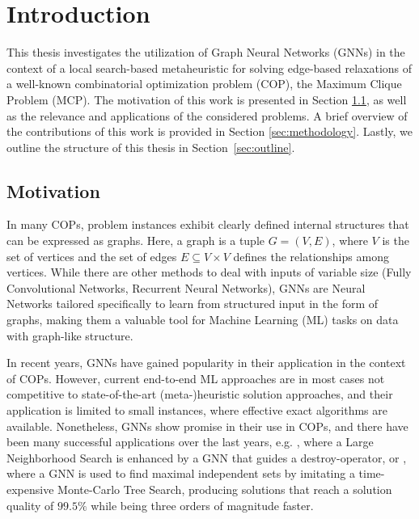 \documentclass[draft,final]{vutinfth} %
\begin{document}
\tableofcontents %

\mainmatter

\chapter{Introduction}

This thesis investigates the utilization of Graph Neural Networks (GNNs) in the context of a local search-based metaheuristic for solving edge-based relaxations of a well-known combinatorial optimization problem (COP), the Maximum Clique Problem (MCP).
The motivation of this work is presented in Section \ref{sec:motivation}, as well as the relevance and applications of the considered problems. A brief overview of the contributions of this work is provided in Section \ref{sec:methodology}. Lastly, we outline the structure of this thesis in Section~\ref{sec:outline}.

\section{Motivation}\label{sec:motivation}
In many COPs, problem instances exhibit clearly defined internal structures that can be expressed as graphs. Here, a graph is a tuple $G = (V, E)$, where $V$ is the set of vertices and the set of edges $E \subseteq V \times V$ defines the relationships among vertices. While there are other methods to deal with inputs of variable size (Fully Convolutional Networks, Recurrent Neural Networks), GNNs are Neural Networks tailored specifically to learn from structured input in the form of graphs, making them a valuable tool for Machine Learning (ML) tasks on data with graph-like structure.   

In recent years, GNNs have gained popularity in their application in the context of COPs. However, current end-to-end ML approaches are in most cases not competitive to state-of-the-art (meta-)heuristic solution approaches, and their application is limited to small instances, where effective exact algorithms are available. Nonetheless, GNNs show promise in their use in COPs, and there have been many successful applications over the last years, e.g. 
\cite{Oberweger2022}, where a Large Neighborhood Search is enhanced by a GNN that guides a destroy-operator, or \cite{NEURIPS2021_0db2e204}, where a GNN is used to find maximal independent sets by imitating a time-expensive Monte-Carlo Tree Search, producing solutions that reach a solution quality of $99.5\%$ while being three orders of magnitude faster. 
\end{document}
